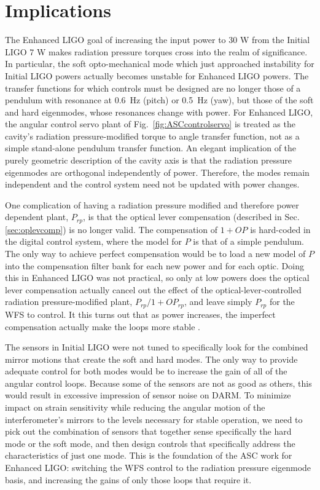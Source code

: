 \section{Implications}
The Enhanced LIGO goal of increasing the input power to 30 W from the
Initial LIGO 7 W makes radiation pressure torques cross into the realm
of significance. In particular, the soft opto-mechanical mode which
just approached instability for Initial LIGO powers actually becomes
unstable for Enhanced LIGO powers. The transfer functions for which
controls must be designed are no longer those of a pendulum with
resonance at 0.6~Hz (pitch) or 0.5~Hz (yaw), but those of the soft and
hard eigenmodes, whose resonances change with power. For Enhanced
LIGO, the angular control servo plant of
Fig.~\ref{fig:ASCcontrolservo} is treated as the cavity's radiation
pressure-modified torque to angle transfer function, not as a simple
stand-alone pendulum transfer function. An elegant implication of the
purely geometric description of the cavity axis is that the radiation
pressure eigenmodes are orthogonal independently of power. Therefore,
the modes remain independent and the control system need not be
updated with power changes.

One complication of having a radiation pressure modified and therefore
power dependent plant, $P_{rp}$, is that the optical lever
compensation (described in Sec. \ref{sec:oplevcomp}) is no longer
valid. The compensation of $1+OP$ is hard-coded in the digital control
system, where the model for $P$ is that of a simple pendulum. The only
way to achieve perfect compensation would be to load a new model of
$P$ into the compensation filter bank for each new power and for each
optic. Doing this in Enhanced LIGO was not practical, so only at low
powers does the optical lever compensation actually cancel out the
effect of the optical-lever-controlled radiation pressure-modified
plant, $P_{rp}/1+OP_{rp}$, and leave simply $P_{rp}$ for the WFS to
control. It this turns out that as power increases, the imperfect
compensation actually make the loops more stable
\cite{Barsotti2008}.

The sensors in Initial LIGO were not tuned to specifically look for
the combined mirror motions that create the soft and hard modes. The
only way to provide adequate control for both modes would be to
increase the gain of all of the angular control loops. Because some of
the sensors are not as good as others, this would result in excessive
impression of sensor noise on DARM. To minimize impact on strain
sensitivity while reducing the angular motion of the interferometer's
mirrors to the levels necessary for stable operation, we need to pick
out the combination of sensors that together sense specifically the
hard mode or the soft mode, and then design controls that specifically
address the characteristics of just one mode. This is the foundation
of the ASC work for Enhanced LIGO: switching the WFS control to the
radiation pressure eigenmode basis, and increasing the gains of only
those loops that require it. 




